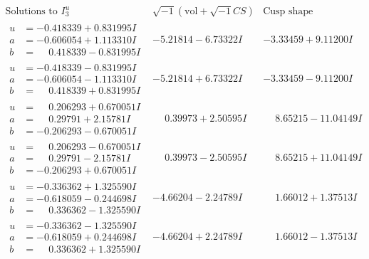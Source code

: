 \documentclass[1p]{elsarticle_modified}
\theoremstyle{definition}
\newcommand{\I}{\sqrt{-1}}
\begin{document}
$$\begin{array}{c|c|c}  
\text{Solutions to }I^u_{3}& \I (\text{vol} + \sqrt{-1}CS) & \text{Cusp shape}\\
 \hline 
\begin{aligned}
u &= -0.418339 + 0.831995 I \\
a &= -0.606054 + 1.113310 I \\
b &= \phantom{-}0.418339 - 0.831995 I\end{aligned}
 & -5.21814 - 6.73322 I & -3.33459 + 9.11200 I \\ \hline\begin{aligned}
u &= -0.418339 - 0.831995 I \\
a &= -0.606054 - 1.113310 I \\
b &= \phantom{-}0.418339 + 0.831995 I\end{aligned}
 & -5.21814 + 6.73322 I & -3.33459 - 9.11200 I \\ \hline\begin{aligned}
u &= \phantom{-}0.206293 + 0.670051 I \\
a &= \phantom{-}0.29791 + 2.15781 I \\
b &= -0.206293 - 0.670051 I\end{aligned}
 & \phantom{-}0.39973 + 2.50595 I & \phantom{-}8.65215 - 11.04149 I \\ \hline\begin{aligned}
u &= \phantom{-}0.206293 - 0.670051 I \\
a &= \phantom{-}0.29791 - 2.15781 I \\
b &= -0.206293 + 0.670051 I\end{aligned}
 & \phantom{-}0.39973 - 2.50595 I & \phantom{-}8.65215 + 11.04149 I \\ \hline\begin{aligned}
u &= -0.336362 + 1.325590 I \\
a &= -0.618059 - 0.244698 I \\
b &= \phantom{-}0.336362 - 1.325590 I\end{aligned}
 & -4.66204 - 2.24789 I & \phantom{-}1.66012 + 1.37513 I \\ \hline\begin{aligned}
u &= -0.336362 - 1.325590 I \\
a &= -0.618059 + 0.244698 I \\
b &= \phantom{-}0.336362 + 1.325590 I\end{aligned}
 & -4.66204 + 2.24789 I & \phantom{-}1.66012 - 1.37513 I \\ \hline\begin{aligned}

\end{aligned}
\end{array}$$
\end{document}
